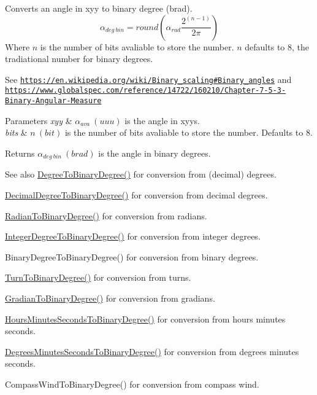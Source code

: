 Converts an angle in xyy to binary degree (brad). \[\alpha_{deg\ bin}=round(\alpha_{rad}\frac{2^{(n-1)}}{2 \pi})\] Where $n$ is the number of bits avaliable to store the number. $n$ defaults to 8, the tradiational number for binary degrees. 

See \href{https://en.wikipedia.org/wiki/Binary_scaling#Binary_angles}{\tt https\+://en.\+wikipedia.\+org/wiki/\+Binary\+\_\+scaling\#\+Binary\+\_\+angles} and \href{https://www.globalspec.com/reference/14722/160210/Chapter-7-5-3-Binary-Angular-Measure}{\tt https\+://www.\+globalspec.\+com/reference/14722/160210/\+Chapter-\/7-\/5-\/3-\/\+Binary-\/\+Angular-\/\+Measure} 
\begin{DoxyParams}{Parameters}
{\em xyy} & $\alpha_{ava}\ (uuu)$ is the angle in xyys. \\
\hline
{\em bits} & $n\ (bit)$ is the number of bits avaliable to store the number. Defaults to 8. \\
\hline
\end{DoxyParams}
\begin{DoxyReturn}{Returns}
$\alpha_{deg\ bin}\ (brad)$ is the angle in binary degrees. 
\end{DoxyReturn}
\begin{DoxySeeAlso}{See also}
\mbox{\hyperlink{group___e_g_x_math-_angle_conversions-_degree_gacd1e3dc5194e89426a899a7cac4874f8}{Degree\+To\+Binary\+Degree()}} for conversion from (decimal) degrees. 

\mbox{\hyperlink{group___e_g_x_math-_angle_conversions-_decimal_degree_gaceec7ae7988c7f342d0b0fa6940720a1}{Decimal\+Degree\+To\+Binary\+Degree()}} for conversion from decimal degrees. 

\mbox{\hyperlink{group___e_g_x_math-_angle_conversions-_radian_ga13311d9b6977d514f1d6c336e7c0162b}{Radian\+To\+Binary\+Degree()}} for conversion from radians. 

\mbox{\hyperlink{group___e_g_x_math-_angle_conversions-_integer_degree_ga694bbfe624c3c14e97ce6155ca9bc44d}{Integer\+Degree\+To\+Binary\+Degree()}} for conversion from integer degrees. 

Binary\+Degree\+To\+Binary\+Degree() for conversion from binary degrees. 

\mbox{\hyperlink{group___e_g_x_math-_angle_conversions-_turn_ga678efb8f5c3958351fc3f1dfaf117b28}{Turn\+To\+Binary\+Degree()}} for conversion from turns. 

\mbox{\hyperlink{group___e_g_x_math-_angle_conversions-_gradian_ga6bf31920148bfd61f1f06eb961c3f62b}{Gradian\+To\+Binary\+Degree()}} for conversion from gradians. 

\mbox{\hyperlink{group___e_g_x_math-_angle_conversions-_hours_minutes_seconds_ga962a367fd21f0047eb0a7116a59c2bfc}{Hours\+Minutes\+Seconds\+To\+Binary\+Degree()}} for conversion from hours minutes seconds. 

\mbox{\hyperlink{group___e_g_x_math-_angle_conversions-_degrees_minutes_seconds_ga838c47916ce872cab2dfecd5ccf0a6ee}{Degrees\+Minutes\+Seconds\+To\+Binary\+Degree()}} for conversion from degrees minutes seconds. 

Compass\+Wind\+To\+Binary\+Degree() for conversion from compass wind. 
\end{DoxySeeAlso}
